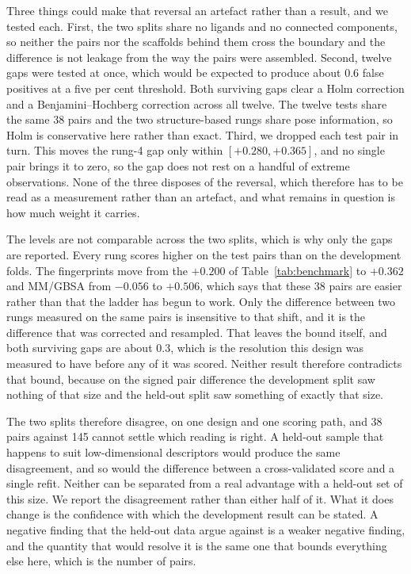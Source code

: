 \begin{table}[tb]
  \centering
  \caption{\textbf{The held-out split against the development split.} The $p$ values
    are Holm- and Benjamini-Hochberg-adjusted across all twelve gaps, and the
    development gap is a difference of scores. The note below the table explains the
    asterisk and gives the bootstrap estimate, which exists only for rung~4.}
  \label{tab:testsplit}
  
\end{table}

Three things could make that reversal an artefact rather than a result, and we tested
each. First, the two splits share no ligands and no connected components, so neither
the pairs nor the scaffolds behind them cross the boundary and the difference is not
leakage from the way the pairs were assembled. Second, twelve gaps were tested at
once, which would be expected to produce about 0.6 false positives at a five per cent
threshold. Both surviving gaps clear a Holm correction and a Benjamini--Hochberg
correction across all twelve. The twelve tests share the same 38 pairs and the two
structure-based rungs share pose information, so Holm is conservative here rather than
exact. Third, we dropped each test pair in turn. This moves the rung-4 gap only within
$[+0.280, +0.365]$, and no single pair brings it to zero, so the gap does not rest on
a handful of extreme observations. None of the three disposes of the reversal, which
therefore has to be read as a measurement rather than an artefact, and what remains in
question is how much weight it carries.

The levels are not comparable across the two splits, which is why only the gaps are
reported. Every rung scores higher on the test pairs than on the development folds.
The fingerprints move from the $+0.200$ of Table~\ref{tab:benchmark} to $+0.362$ and
MM/GBSA from $-0.056$ to $+0.506$, which says that these 38 pairs are easier rather
than that the ladder has begun to work. Only the difference between two rungs measured on the same pairs is insensitive
to that shift, and it is the difference that was corrected and resampled. That leaves the bound itself, and both surviving gaps are about $0.3$, which is the
resolution this design was measured to have before any of it was scored. Neither result therefore contradicts that bound,
because on the signed pair difference the development split saw nothing of that size
and the held-out split saw something of exactly that size.

The two splits therefore disagree, on one design and one scoring path, and 38 pairs
against 145 cannot settle which reading is right. A held-out sample that happens to suit
low-dimensional descriptors would produce the same disagreement, and so would the
difference between a cross-validated score and a single refit. Neither can be separated from a
real advantage with a held-out set of this size. We report the disagreement rather than
either half of it. What it does change is the confidence with which the development
result can be stated. A negative finding that the held-out data argue against is a
weaker negative finding, and the quantity that would resolve it is the same one that
bounds everything else here, which is the number of pairs.

